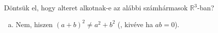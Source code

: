 \begin{exercise}{%
    Döntsük el, hogy alteret alkotnak-e az alábbi számhármasok
    $\mathbb R^3$-ban?
  }
{\begin{enumerate}[a)]
            \tcbline
      \item Nem, hiszen $(a + b)^2 \neq a^2 + b^2$ (, kivéve ha $ab = 0$).
    \end{enumerate}
  }
\end{exercise}
